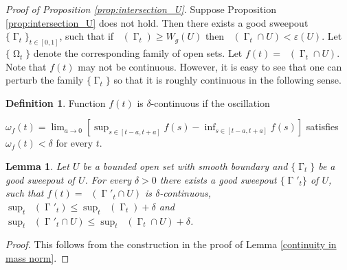 \documentclass[12pt]{amsart}
\newtheorem{proposition}[theorem]{Proposition}
\newtheorem{lemma}[theorem]{Lemma}
\DeclareMathOperator{\Hn}{\mathcal{H}^n}
\DeclareMathOperator{\G}{\Gamma}
\DeclareMathOperator{\Om}{\Omega}
\theoremstyle{definition}
\newtheorem{definition}[theorem]{Definition}
\begin{document}

%

\emph{Proof of Proposition \ref*{prop:intersection_U}}.
Suppose Proposition \ref*{prop:intersection_U} does not
hold. 
Then there exists
a good sweepout $\{ \G_t \}_{t \in [0,1]}$,
such that
if $\Hn(\G_t) \geq W_g(U)$ then
$\Hn(\G_t \cap U) < \varepsilon(U)$.
Let $\{\Om_t \}$ denote the corresponding
family of open sets. 
Let $f(t) = \Hn(\G_t \cap U)$. Note that $f(t)$
may not be continuous. However, it is easy to see
that one can perturb the family $\{ \G_t \}$
so that it is roughly continuous in the following sense.

\begin{definition}
Function $f(t)$ is $\delta$-continuous if
the oscillation 

\noindent
$\omega_f(t) = \lim_{a \rightarrow 0}[ \sup_{s \in [t-a,t+a]} f(s) -
\inf_{s \in [t-a,t+a]} f(s)]$ satisfies $\omega_f(t) < \delta$ for every
$t$.
\end{definition}

\begin{lemma} \label{area_continuity}
Let $U$ be a bounded open set with smooth boundary
and $\{ \G_t \}$ be a good sweepout of $U$.
For every $\delta>0$ there exists a 
good sweepout
$\{ \G'_t \}$ of $U$, such that
$f(t) = \Hn(\G'_t \cap U)$ is $\delta$-continuous,
$\sup_t \Hn(\G'_t) \leq \sup_t \Hn(\G_t) + \delta$
and $\sup_t \Hn(\G'_t \cap U) \leq \sup_t \Hn(\G_t \cap U) + \delta$.
\end{lemma}

\begin{proof}
This follows from the construction in the proof
of Lemma \ref*{continuity in mass norm}.
\end{proof}
\end{document}
